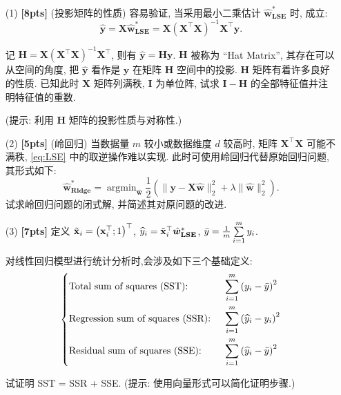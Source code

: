\documentclass[a4paper,UTF8]{article}
\numberwithin{equation}{section}
\theoremstyle{definition}
\def \X {\mathbf{X}}
\def \w {\hat{\boldsymbol{w}}}
\def \y {\mathbf{y}}
\def \x {\mathbf{x}}
\def \hy {\widehat{y}}
\def \by {\Bar{y}}
\def \H {\mathbf{H}}
\def \I {\mathbf{I}}
\begin{document}
	\begin{enumerate}
		\item[(1)] \textbf{[8pts]} (投影矩阵的性质) 
		容易验证, 当采用最小二乘估计 $\w_{\textbf{LSE}}^*$ 时, 成立: 
		\begin{equation*}
			\mathbf{\hy} = \X \w_{\textbf{LSE}}^* = \X\left(\X^\top\X\right)^{-1}\X^\top\y.
		\end{equation*}
		
		记 $\H = \X\left(\X^\top\X\right)^{-1}\X^\top$, 则有 $\mathbf{\hy} = \H\y$. $\H$ 被称为 “Hat Matrix”, 其存在可以从空间的角度, 把 $\mathbf{\hy}$ 看作是 $\y$ 在矩阵 $\H$ 空间中的投影. $\H$ 矩阵有着许多良好的性质.
		已知此时 $\X$ 矩阵列满秩, $\I$ 为单位阵, 试求 $\I - \H$ 的全部特征值并注明特征值的重数.
		
		(提示: 利用 $\H$ 矩阵的投影性质与对称性.)
		
		
		
		\item[(2)] \textbf{[5pts]} (岭回归) 当数据量 $m$ 较小或数据维度 $d$ 较高时, 矩阵 $\X^\top\X$ 可能不满秩, \ref{eq:LSE} 中的取逆操作难以实现. 此时可使用岭回归代替原始回归问题, 其形式如下: 
		\begin{equation}
			\label{eq:Ridge}
			\w_{\textbf{Ridge}}^* = \mathop{\arg\min}_{\w} \frac{1}{2}\left(\lVert \y - \X \w \rVert_2^2 +\lambda \lVert \w \rVert_2^2\right).
		\end{equation}
		试求岭回归问题的闭式解, 并简述其对原问题的改进.
		
		\item[(3)] \textbf{[7pts]} 定义 $\Tilde{\x}_i = \left(\x_i^\top;1\right)^\top$,
		$\hy_i = \Tilde{\x}_i^\top \w_{\textbf{LSE}}^*$,
		$\by = \frac{1}{m} \sum\limits_{i=1}^m y_i $. 
		
		对线性回归模型进行统计分析时,会涉及如下三个基础定义: 
		\begin{equation*}
			\left\{
			\begin{aligned}
				&\text{Total sum of squares (SST): }& &\sum\limits_{i=1}^m\left(y_i-\by\right)^2 \\
				&\text{Regression sum of squares (SSR): }& &\sum\limits_{i=1}^m\left(\hy_i-y_i\right)^2 \\
				&\text{Residual sum of squares (SSE): }& &\sum\limits_{i=1}^m\left(\hy_i-\by\right)^2
			\end{aligned}
			\right.
		\end{equation*}
		
		试证明 SST = SSR + SSE. (提示: 使用向量形式可以简化证明步骤.)
		
		
		
	\end{enumerate}
	
\end{document}
